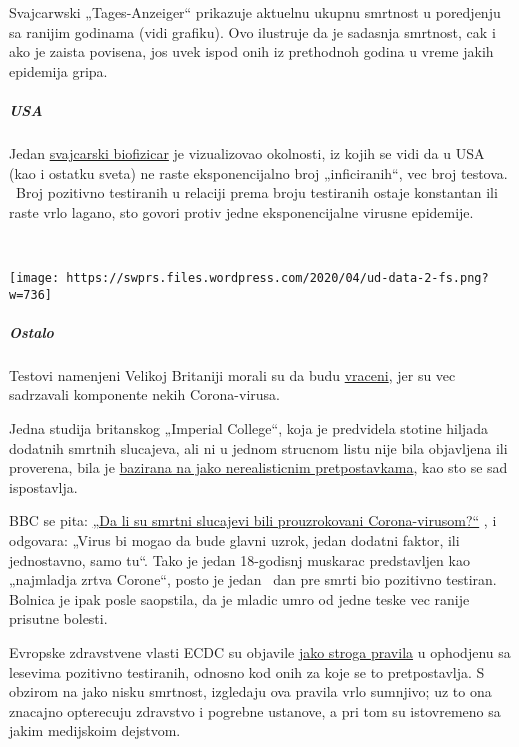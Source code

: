 Svajcarwski „Tages-Anzeiger`` prikazuje aktuelnu ukupnu smrtnost u
poredjenju sa ranijim godinama (vidi grafiku). Ovo ilustruje da je
sadasnja smrtnost, cak i ako je zaista povisena, jos uvek ispod onih iz
prethodnoh godina u vreme jakih epidemija gripa.

\hypertarget{usa}{%
\subparagraph{\texorpdfstring{\textbf{USA}}{USA}}\label{usa}}

Jedan
\href{https://swprs.org/rate-of-positive-covid19-tests/}{svajcarski
biofizicar} je vizualizovao okolnosti, iz kojih se vidi da u USA (kao i
ostatku sveta) ne raste eksponencijalno broj „inficiranih``, vec broj
testova. ~Broj pozitivno testiranih u relaciji prema broju testiranih
ostaje konstantan ili raste vrlo lagano, sto govori protiv jedne
eksponencijalne virusne epidemije.

~

\texttt{[image: https://swprs.files.wordpress.com/2020/04/ud-data-2-fs.png?w=736]}

\hypertarget{ostalo}{%
\subparagraph{\texorpdfstring{\textbf{Ostalo}}{Ostalo}}\label{ostalo}}

Testovi namenjeni Velikoj Britaniji morali su da budu
\href{https://www.telegraph.co.uk/news/2020/03/30/uks-attempt-ramp-coronavirus-testing-hindered-key-components/}{vraceni},
jer su vec sadrzavali komponente nekih Corona-virusa.

Jedna studija britanskog „Imperial College``, koja je predvidela stotine
hiljada dodatnih smrtnih slucajeva, ali ni u jednom strucnom listu nije
bila objavljena ili proverena, bila je
\href{https://judithcurry.com/2020/04/01/imperial-college-uk-covid-19-numbers-dont-seem-to-add-up/}{bazirana
na jako nerealisticnim pretpostavkama}, kao sto se sad ispostavlja.

BBC se pita: \href{https://www.bbc.com/news/health-51979654}{„Da li su
smrtni slucajevi bili prouzrokovani Corona-virusom?``} , i odgovara:
„Virus bi mogao da bude glavni uzrok, jedan dodatni faktor, ili
jednostavno, samo tu``. Tako je jedan 18-godisnj muskarac predstavljen
kao „najmladja zrtva Corone``, posto je jedan~ dan pre smrti bio
pozitivno testiran. Bolnica je ipak posle saopstila, da je mladic umro
od jedne teske vec ranije prisutne bolesti.

Evropske zdravstvene vlasti ECDC su objavile
\href{https://www.ecdc.europa.eu/sites/default/files/documents/COVID-19-safe-handling-of-bodies-or-persons-dying-from-COVID19.pdf}{jako
stroga pravila} u ophodjenu sa lesevima pozitivno testiranih, odnosno
kod onih za koje se to pretpostavlja. S obzirom na jako nisku smrtnost,
izgledaju ova pravila vrlo sumnjivo; uz to ona znacajno opterecuju
zdravstvo i pogrebne ustanove, a pri tom su istovremeno sa jakim
medijskoim dejstvom.

